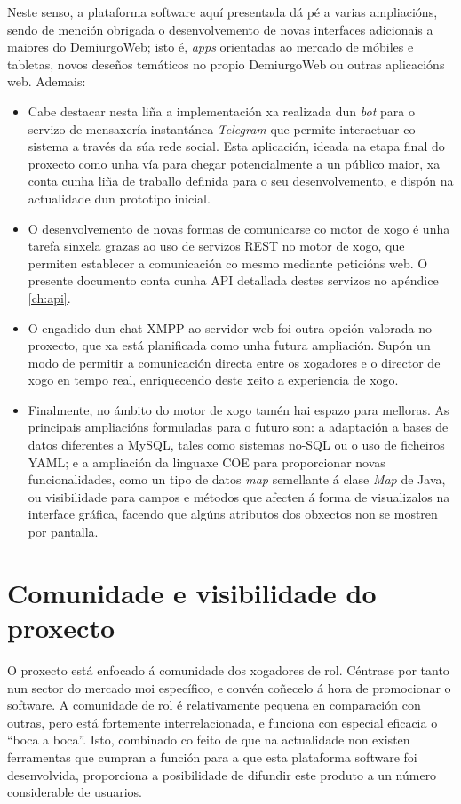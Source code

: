 Neste senso, a plataforma software aquí presentada dá pé a varias ampliacións,
sendo de mención obrigada o desenvolvemento de novas interfaces adicionais a maiores do DemiurgoWeb; isto é,
\textit{apps} orientadas ao mercado de móbiles e tabletas, novos deseños
temáticos no propio DemiurgoWeb ou outras aplicacións web. Ademais:

\begin{itemize}

\item Cabe destacar nesta liña a implementación xa realizada dun \textit{bot}
para o servizo de mensaxería instantánea \textit{Telegram} que permite interactuar co
sistema a través da súa rede social.
Esta aplicación, ideada na etapa final do proxecto como unha vía para chegar potencialmente a un público
maior, xa conta cunha liña de traballo definida para o seu desenvolvemento, e
dispón na actualidade dun prototipo inicial.

\item O desenvolvemento de novas formas de comunicarse co motor de xogo é unha
tarefa sinxela grazas ao uso de servizos REST no motor de xogo, que permiten
establecer a comunicación co mesmo mediante peticións web. O presente documento
conta cunha API detallada destes servizos no apéndice \ref{ch:api}.

\item O engadido dun chat XMPP ao servidor web foi outra opción valorada no
proxecto, que xa está planificada como unha futura ampliación. Supón un modo de
permitir a comunicación directa entre os xogadores e o director de xogo en
tempo real, enriquecendo deste xeito a experiencia de xogo.

\item Finalmente, no ámbito do motor de xogo tamén hai espazo para melloras. As
principais ampliacións formuladas para o futuro son: a
adaptación a bases de datos diferentes a MySQL, tales como
sistemas no-SQL ou o uso de ficheiros YAML; e a ampliación da linguaxe COE para
proporcionar novas funcionalidades, como un tipo de datos \textit{map}
semellante á clase \textit{Map} de Java, ou visibilidade para campos e métodos
que afecten á forma de visualizalos na interface gráfica, facendo que algúns
atributos dos obxectos non se mostren por pantalla.
\end{itemize}

\section{Comunidade e visibilidade do proxecto}
O proxecto está enfocado á comunidade dos xogadores de rol. Céntrase por tanto
nun sector do mercado moi específico, e convén coñecelo á hora de promocionar
o software. A comunidade de rol é relativamente pequena en comparación con
outras, pero está fortemente interrelacionada, e funciona con especial eficacia
o ``boca a boca''. Isto, combinado co feito de que na actualidade non existen
ferramentas que cumpran a función para a que esta plataforma software foi
desenvolvida, proporciona a posibilidade de difundir este produto a un número
considerable de usuarios.

